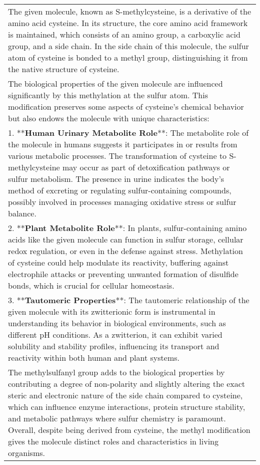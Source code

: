 \begin{table*}[t!]
\begin{tcolorbox}[colframe=gray,colback=white,boxrule=1pt,arc=0.6em,boxsep=0mm,left=5.pt,right=15pt]
\renewcommand{\arraystretch}{1.2}
\begin{tabular}{p{}}
    The given molecule, known as S-methylcysteine, is a derivative of the amino acid cysteine. In its structure, the core amino acid framework is maintained, which consists of an amino group, a carboxylic acid group, and a side chain. In the side chain of this molecule, the sulfur atom of cysteine is bonded to a methyl group, distinguishing it from the native structure of cysteine. \\
    The biological properties of the given molecule are influenced significantly by this methylation at the sulfur atom. This modification preserves some aspects of cysteine's chemical behavior but also endows the molecule with unique characteristics:\\
    1. **\textbf{Human Urinary Metabolite Role}**: The metabolite role of the molecule in humans suggests it participates in or results from various metabolic processes. The transformation of cysteine to S-methylcysteine may occur as part of detoxification pathways or sulfur metabolism. The presence in urine indicates the body's method of excreting or regulating sulfur-containing compounds, possibly involved in processes managing oxidative stress or sulfur balance.\\
    2. **\textbf{Plant Metabolite Role}**: In plants, sulfur-containing amino acids like the given molecule can function in sulfur storage, cellular redox regulation, or even in the defense against stress. Methylation of cysteine could help modulate its reactivity, buffering against electrophile attacks or preventing unwanted formation of disulfide bonds, which is crucial for cellular homeostasis.\\
    3. **\textbf{Tautomeric Properties}**: The tautomeric relationship of the given molecule with its zwitterionic form is instrumental in understanding its behavior in biological environments, such as different pH conditions. As a zwitterion, it can exhibit varied solubility and stability profiles, influencing its transport and reactivity within both human and plant systems.\\
    The methylsulfanyl group adds to the biological properties by contributing a degree of non-polarity and slightly altering the exact steric and electronic nature of the side chain compared to cysteine, which can influence enzyme interactions, protein structure stability, and metabolic pathways where sulfur chemistry is paramount. Overall, despite being derived from cysteine, the methyl modification gives the molecule distinct roles and characteristics in living organisms.\\
    \cmidrule{1-1}
\end{tabular}


\end{tcolorbox}
\end{table*}

